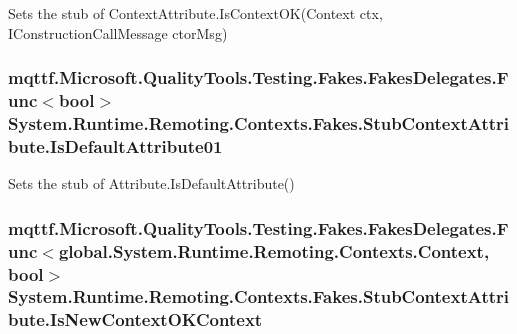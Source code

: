 Sets the stub of Context\-Attribute.\-Is\-Context\-O\-K(\-Context ctx, I\-Construction\-Call\-Message ctor\-Msg)

\hypertarget{class_system_1_1_runtime_1_1_remoting_1_1_contexts_1_1_fakes_1_1_stub_context_attribute_adb1ff4e7b39fd9751c2a4beb28ce5fc6}{
\subsubsection[{Is\-Default\-Attribute01}]{\setlength{\rightskip}{0pt plus 5cm}mqttf.\-Microsoft.\-Quality\-Tools.\-Testing.\-Fakes.\-Fakes\-Delegates.\-Func$<$bool$>$ System.\-Runtime.\-Remoting.\-Contexts.\-Fakes.\-Stub\-Context\-Attribute.\-Is\-Default\-Attribute01}}\label{class_system_1_1_runtime_1_1_remoting_1_1_contexts_1_1_fakes_1_1_stub_context_attribute_adb1ff4e7b39fd9751c2a4beb28ce5fc6}


Sets the stub of Attribute.\-Is\-Default\-Attribute()

\hypertarget{class_system_1_1_runtime_1_1_remoting_1_1_contexts_1_1_fakes_1_1_stub_context_attribute_aa6edf2513457a1def47694e13cb8844b}{
\subsubsection[{Is\-New\-Context\-O\-K\-Context}]{\setlength{\rightskip}{0pt plus 5cm}mqttf.\-Microsoft.\-Quality\-Tools.\-Testing.\-Fakes.\-Fakes\-Delegates.\-Func$<$global.\-System.\-Runtime.\-Remoting.\-Contexts.\-Context, bool$>$ System.\-Runtime.\-Remoting.\-Contexts.\-Fakes.\-Stub\-Context\-Attribute.\-Is\-New\-Context\-O\-K\-Context}}\label{class_system_1_1_runtime_1_1_remoting_1_1_contexts_1_1_fakes_1_1_stub_context_attribute_aa6edf2513457a1def47694e13cb8844b}


